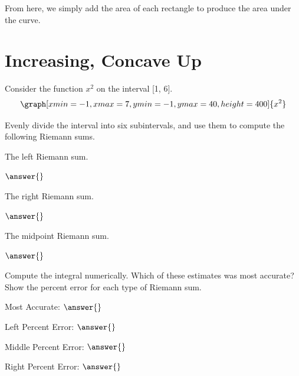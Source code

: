 \documentclass{ximera}
\begin{document}
From here, we simply add the area of each rectangle to produce the area under the curve.

\section{Increasing, Concave Up}
Consider the function $x^2$ on the interval [1, 6].
\[
\graph[xmin=-1,xmax=7,ymin=-1,ymax=40,height=400]{x^2}
\]


\begin{question}
Evenly divide the interval into six subintervals, and use them to compute the following Riemann sums.


The left Riemann sum.

\begin{onlineOnly}
\begin{sageCell}

\end{sageCell}
\end{onlineOnly}

$\answer{}$


The right Riemann sum.

\begin{onlineOnly}
\begin{sageCell}

\end{sageCell}
\end{onlineOnly}

$\answer{}$


The midpoint Riemann sum.
\begin{onlineOnly}
\begin{sageCell}

\end{sageCell}
\end{onlineOnly}

$\answer{}$

Compute the integral numerically. Which of these estimates was most accurate? Show the percent error for each type of Riemann sum.

\begin{onlineOnly}
\begin{sageCell}

\end{sageCell}
\end{onlineOnly}

Most Accurate: $\answer{}$

Left Percent Error: $\answer{}$

Middle Percent Error: $\answer{}$

Right Percent Error: $\answer{}$
\end{question}
\end{document}
